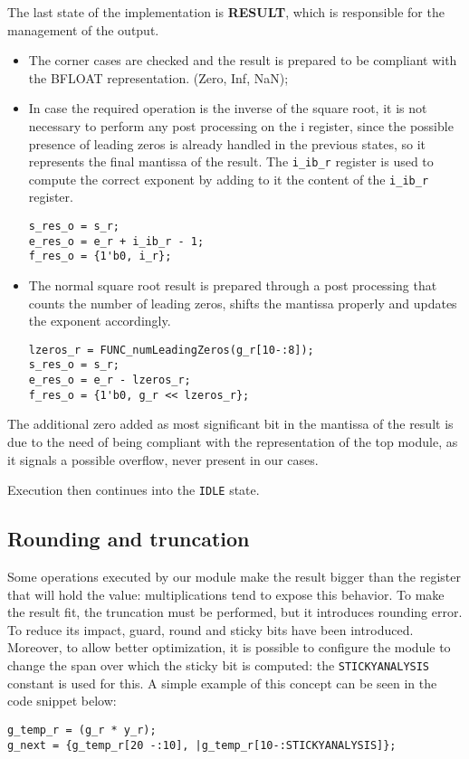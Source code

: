 \documentclass[paper=letter, fontsize=12pt]{article}
\begin{document}
The last state of the implementation is \textbf{RESULT}, which is responsible for the management of the output.
\begin{itemize}
    \item The corner cases are checked and the result is prepared to be compliant with the BFLOAT representation. (Zero, Inf, NaN);
    \item In case the required operation is the inverse of the square root, it is not necessary to perform any post processing on the i register, since the possible presence of leading zeros is already handled in the previous states, so it represents the final mantissa of the result. The \texttt{i\_ib\_r} register is used to compute the correct exponent by adding to it the content of the \texttt{i\_ib\_r} register.
\begin{lstlisting}
s_res_o = s_r;
e_res_o = e_r + i_ib_r - 1;
f_res_o = {1'b0, i_r};
\end{lstlisting}
    \item The normal square root result is prepared through a post processing that counts the number of leading zeros, shifts the mantissa properly and updates the exponent accordingly.
\begin{lstlisting}
lzeros_r = FUNC_numLeadingZeros(g_r[10-:8]);
s_res_o = s_r;
e_res_o = e_r - lzeros_r;
f_res_o = {1'b0, g_r << lzeros_r};
\end{lstlisting}
\end{itemize}
The additional zero added as most significant bit in the mantissa of the result is due to the need of being compliant with the representation of the top module, as it signals a possible overflow, never present in our cases. 

Execution then continues into the \texttt{IDLE} state.

\subsection{Rounding and truncation}
Some operations executed by our module make the result bigger than the register that will hold the value: multiplications tend to expose this behavior. To make the result fit, the truncation must be performed, but it introduces rounding error. To reduce its impact, guard, round and sticky bits have been introduced. Moreover, to allow better optimization, it is possible to configure the module to change the span over which the sticky bit is computed: the \texttt{STICKYANALYSIS} constant is used for this. A simple example of this concept can be seen in the code snippet below:
\begin{lstlisting}
g_temp_r = (g_r * y_r);		 
g_next = {g_temp_r[20 -:10], |g_temp_r[10-:STICKYANALYSIS]};
\end{lstlisting}
\end{document}
